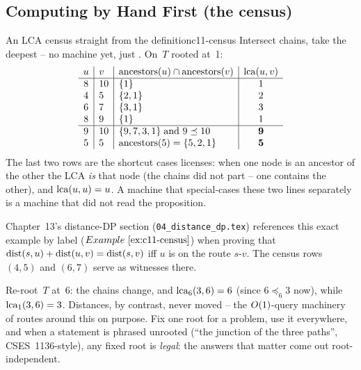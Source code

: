 \subsection{Computing by Hand First (the census)}

\begin{example}{An LCA census straight from the definition}{c11-census}
Intersect chains, take the deepest -- no machine yet, just
.  On~\(T\) rooted at~1:
\[
\begin{array}{c|l|l|c}
u & v & \operatorname{ancestors}(u) \cap \operatorname{ancestors}(v) & \operatorname{lca}(u,v) \\ \hline
8  & 10 & \{1\} & 1\\
4  & 5  & \{2, 1\} & 2\\
6  & 7  & \{3, 1\} & 3\\
8  & 9  & \{1\} & 1\\ \hline
9  & 10 & \{9, 7, 3, 1\}\;\text{and } 9 \preceq 10 & \mathbf{9}\\
5  & 5  & \operatorname{ancestors}(5) = \{5,2,1\} & \mathbf{5}
\end{array}
\]
The last two rows are the shortcut cases  licenses:
when one node is an ancestor of the other the LCA \emph{is} that node (the
chains did not part -- one contains the other), and
\(\operatorname{lca}(u,u) = u\).  A machine that special-cases these two lines
separately is a machine that did not read the proposition.
\end{example}

\begin{notebox}
Chapter~13's distance-DP section (\texttt{04\_distance\_dp.tex})
references this exact example by label (\(\exref{c11-census}\)) when
proving that \(\operatorname{dist}(s,u)+\operatorname{dist}(u,v)=\operatorname{dist}(s,v)\) iff \(u\) is on the
route \(s\)-\(v\).  The census rows \((4,5)\) and \((6,7)\) serve as
witnesses there.
\end{notebox}

\begin{warningbox}
Re-root~\(T\) at~6: the chains change, and \(\operatorname{lca}_6(3,6) = 6\) (since
\(6 \preceq_6 3\) now), while \(\operatorname{lca}_1(3,6) = 3\).  Distances, by contrast,
never moved -- the \(O(1)\)-query machinery of 
routes around this on purpose.  Fix one root for a problem, use it
everywhere, and when a statement is phrased unrooted (``the junction of
the three paths'', CSES~1136-style), any fixed root is \emph{legal}: the
answers that matter come out root-independent.
\end{warningbox}

